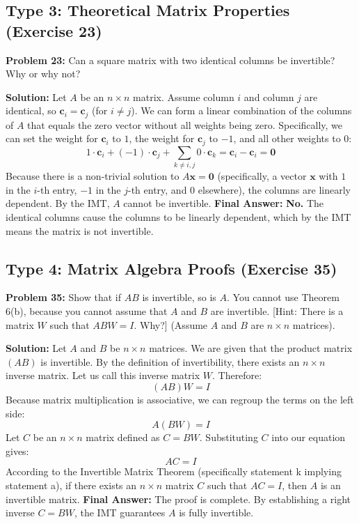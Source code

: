 \documentclass[12pt]{article}
\begin{document}
\subsection{Type 3: Theoretical Matrix Properties (Exercise 23)}

\textbf{Problem 23:} Can a square matrix with two identical columns be invertible? Why or why not?

\textbf{Solution:}
Let $A$ be an $n \times n$ matrix. Assume column $i$ and column $j$ are identical, so $\mathbf{c}_i = \mathbf{c}_j$ (for $i \neq j$).
We can form a linear combination of the columns of $A$ that equals the zero vector without all weights being zero. Specifically, we can set the weight for $\mathbf{c}_i$ to $1$, the weight for $\mathbf{c}_j$ to $-1$, and all other weights to $0$:
\[
1 \cdot \mathbf{c}_i + (-1) \cdot \mathbf{c}_j + \sum_{k \neq i,j} 0 \cdot \mathbf{c}_k = \mathbf{c}_i - \mathbf{c}_i = \mathbf{0}
\]
Because there is a non-trivial solution to $A\mathbf{x} = \mathbf{0}$ (specifically, a vector $\mathbf{x}$ with $1$ in the $i$-th entry, $-1$ in the $j$-th entry, and $0$ elsewhere), the columns are linearly dependent. By the IMT, $A$ cannot be invertible.
\textbf{Final Answer:} \textbf{No.} The identical columns cause the columns to be linearly dependent, which by the IMT means the matrix is not invertible.

\subsection{Type 4: Matrix Algebra Proofs (Exercise 35)}

\textbf{Problem 35:} Show that if $AB$ is invertible, so is $A$. You cannot use Theorem 6(b), because you cannot assume that $A$ and $B$ are invertible. [Hint: There is a matrix $W$ such that $ABW = I$. Why?] (Assume $A$ and $B$ are $n \times n$ matrices).

\textbf{Solution:}
Let $A$ and $B$ be $n \times n$ matrices. We are given that the product matrix $(AB)$ is invertible.
By the definition of invertibility, there exists an $n \times n$ inverse matrix. Let us call this inverse matrix $W$. Therefore:
\[
(AB)W = I
\]
Because matrix multiplication is associative, we can regroup the terms on the left side:
\[
A(BW) = I
\]
Let $C$ be an $n \times n$ matrix defined as $C = BW$. Substituting $C$ into our equation gives:
\[
AC = I
\]
According to the Invertible Matrix Theorem (specifically statement k implying statement a), if there exists an $n \times n$ matrix $C$ such that $AC = I$, then $A$ is an invertible matrix.
\textbf{Final Answer:} The proof is complete. By establishing a right inverse $C = BW$, the IMT guarantees $A$ is fully invertible.
\end{document}
